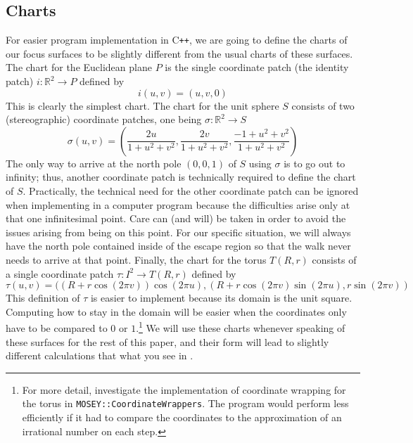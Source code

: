 \documentclass[12pt]{article}
\newcommand{\R}{\mathbb{R}}
\begin{document}
	\subsection{Charts}
		For easier program implementation in C\texttt{++}, we are going to define the charts of our focus surfaces to be slightly different from the usual charts of these surfaces.
		The chart for the Euclidean plane $P$ is the single coordinate patch (the identity patch) $i: \R^2 \to P$ defined by
		$$ i(u,v) = ( u , v , 0 ) $$
		This is clearly the simplest chart.
		The chart for the unit sphere $S$ consists of two (stereographic) coordinate patches, one being $\sigma:\R^2 \to S$
		$$ \sigma(u,v) = \left( \frac{2u}{1+u^2+v^2} , \frac{2v}{1+u^2+v^2} , \frac{-1+u^2+v^2}{1+u^2+v^2} \right) $$
		The only way to arrive at the north pole $(0,0,1)$ of $S$ using $\sigma$ is to go out to infinity; thus, another coordinate patch is technically required to define the chart of $S$.
		Practically, the technical need for the other coordinate patch can be ignored when implementing in a computer program because the difficulties arise only at that one infinitesimal point.
		Care can (and will) be taken in order to avoid the issues arising from being on this point.
		For our specific situation, we will always have the north pole contained inside of the escape region so that the walk never needs to arrive at that point. 
		Finally, the chart for the torus $T(R,r)$ consists of a single coordinate patch $\tau:I^2 \to T(R,r)$ defined by
		$$ \tau(u,v) = ( (R+r\cos(2\pi v))\cos(2\pi u) , (R+r\cos(2\pi v)\sin(2\pi u) , r\sin(2\pi v) ) $$
		This definition of $\tau$ is easier to implement because its domain is the unit square.
		Computing how to stay in the domain will be easier when the coordinates only have to be compared to $0$ or $1$.\footnote{For more detail, investigate the implementation of coordinate wrapping for the torus in \texttt{MOSEY::CoordinateWrappers}. The program would perform less efficiently if it had to compare the coordinates to the approximation of an irrational number on each step.}
		We will use these charts whenever speaking of these surfaces for the rest of this paper, and their form will lead to slightly different calculations that what you see in \cite{BanchoffLovett_DiffGeo_2010,Irons_GeodesicsTorus_2005}.
		
\end{document}
